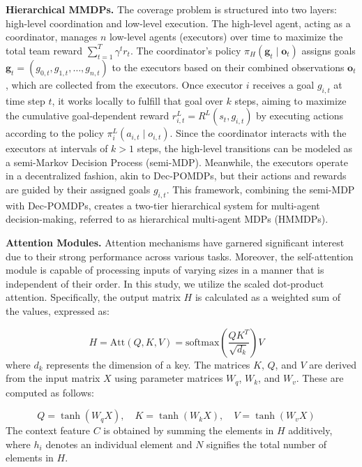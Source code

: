 \documentclass[preprint,12pt]{elsarticle}
\begin{document}

\noindent\textbf{Hierarchical MMDPs.} The coverage problem is structured into two layers: high-level coordination and low-level execution. The high-level agent, acting as a coordinator, manages \( n \) low-level agents (executors) over time to maximize the total team reward \( \sum_{t=1}^{T} \gamma^t r_t \). The coordinator's policy \( \pi_H(\mathbf{g}_t \mid \mathbf{o}_t) \) assigns goals \( \mathbf{g}_t = (g_{0,t}, g_{1,t}, \dots, g_{n,t}) \) to the executors based on their combined observations \( \mathbf{o}_t \), which are collected from the executors. Once executor \( i \) receives a goal \( g_{i,t} \) at time step \( t \), it works locally to fulfill that goal over \( k \) steps, aiming to maximize the cumulative goal-dependent reward \( r^L_{i,t} = R^L(s_t, g_{i,t}) \) by executing actions according to the policy \( \pi^L_i(a_{i,t} \mid o_{i,t}) \). Since the coordinator interacts with the executors at intervals of \( k > 1 \) steps, the high-level transitions can be modeled as a semi-Markov Decision Process (semi-MDP). Meanwhile, the executors operate in a decentralized fashion, akin to Dec-POMDPs, but their actions and rewards are guided by their assigned goals \( g_{i,t} \). This framework, combining the semi-MDP with Dec-POMDPs, creates a two-tier hierarchical system for multi-agent decision-making, referred to as hierarchical multi-agent MDPs (HMMDPs).


\noindent\textbf{Attention Modules.} Attention mechanisms have garnered significant interest due to their strong performance across various tasks. Moreover, the self-attention module is capable of processing inputs of varying sizes in a manner that is independent of their order. In this study, we utilize the scaled dot-product attention. Specifically, the output matrix \( H \) is calculated as a weighted sum of the values, expressed as:

\[
H = \text{Att}(Q, K, V) = \text{softmax}\left(\frac{QK^T}{\sqrt{d_k}}\right)V \quad 
\] where \( d_k \) represents the dimension of a key. The matrices \( K \), \( Q \), and \( V \) are derived from the input matrix \( X \) using parameter matrices \( W_q \), \( W_k \), and \( W_v \). These are computed as follows:

\[
Q = \tanh(W_qX), \quad K = \tanh(W_kX), \quad V = \tanh(W_vX) \quad 
\] The context feature \( C \) is obtained by summing the elements in \( H \) additively, where \( h_i \) denotes an individual element and \( N \) signifies the total number of elements in \( H \).
\end{document}
